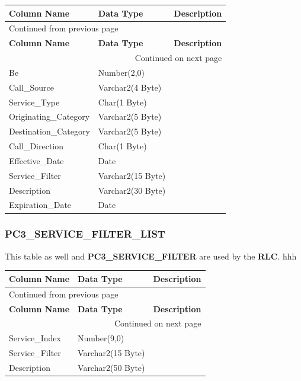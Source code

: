 \documentclass[12pt,twoside]{article}
\begin{document}
\begin{longtable}{l|l|l}
\hline
\textbf{Column Name} & \textbf{Data Type} & \textbf{Description}\\
\hline
\endfirsthead
\multicolumn{3}{l}{Continued from previous page} \\
\hline

\textbf{Column Name} & \textbf{Data Type} & \textbf{Description} \\

\hline
\endhead
\hline\multicolumn{3}{r}{Continued on next page} \\
\endfoot
\endlastfoot
\hline
Be & Number(2,0) & \\
Call\_Source & Varchar2(4 Byte) & \\
Service\_Type & Char(1 Byte) & \\
Originating\_Category & Varchar2(5 Byte) & \\
Destination\_Category & Varchar2(5 Byte) & \\
Call\_Direction & Char(1 Byte) & \\
Effective\_Date & Date & \\
Service\_Filter & Varchar2(15 Byte) & \\
Description & Varchar2(30 Byte) & \\
Expiration\_Date & Date & \\
\hline
\end{longtable}

\normalsize

\subsubsection{PC3\_SERVICE\_FILTER\_LIST}
\label{sec:orgheadline122}

This table as well and \textbf{PC3\_SERVICE\_FILTER} are used by
the \textbf{RLC}.
\footnotesize
hhh
\begin{longtable}{l|l|l}
\hline
\textbf{Column Name} & \textbf{Data Type} & \textbf{Description}\\
\hline
\endfirsthead
\multicolumn{3}{l}{Continued from previous page} \\
\hline

\textbf{Column Name} & \textbf{Data Type} & \textbf{Description} \\

\hline
\endhead
\hline\multicolumn{3}{r}{Continued on next page} \\
\endfoot
\endlastfoot
\hline
Service\_Index & Number(9,0) & \\
Service\_Filter & Varchar2(15 Byte) & \\
Description & Varchar2(50 Byte) & \\
\hline
\end{longtable}
\end{document}
